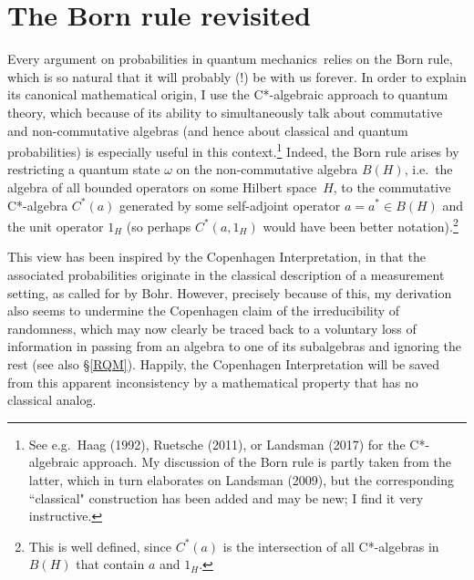 \documentclass[11pt,a4paper]{article}
\numberwithin{equation}{section}
\newcommand{\qm}{quantum mechanics}
\newcommand{\Hs}{Hilbert space} \newcommand{\Bs}{Banach space}
\newcommand{\om}{\omega} \newcommand{\Om}{\Omega}
\begin{document}
 \section{The Born rule revisited}\label{BR}
 Every argument on probabilities in \qm\ relies on the Born rule, which is so natural that it will probably (!) be with us forever. In order to explain its canonical mathematical origin, I use the C*-algebraic approach to quantum theory, which because of its ability to simultaneously talk about commutative and non-commutative algebras (and hence about classical and quantum probabilities) is especially useful in this context.\footnote{See e.g.\ Haag (1992), Ruetsche (2011), or Landsman (2017) for the  C*-algebraic approach. My discussion of the Born rule is partly taken from the latter, which in turn elaborates on Landsman (2009), but the corresponding ``classical" construction has been added and may be new; I find it very instructive.} Indeed, the Born rule arises  by restricting a quantum state $\om$ on the non-commutative algebra $B(H)$, i.e.\ the algebra of all bounded operators on some \Hs\ $H$,  to the commutative  C*-algebra $C^*(a)$ generated by some self-adjoint operator $a=a^*\in B(H)$ and the unit operator $1_H$ (so perhaps $C^*(a,1_H)$ would have been better notation).\footnote{This is well defined, since $C^*(a)$ is  the intersection of all C*-algebras in $B(H)$ that contain $a$ and $1_H$.}  
 
 This view has been inspired by  the Copenhagen Interpretation, in that the associated probabilities originate in the classical description of a measurement setting, as called for by Bohr. However, 
precisely because of this, my derivation also seems to undermine the Copenhagen claim of the irreducibility of randomness, which may now clearly be traced back to a voluntary loss of information in passing from an algebra to one of its subalgebras and ignoring the rest (see also \S\ref{RQM}). Happily, the Copenhagen Interpretation will be saved from this apparent inconsistency by a mathematical property that has no classical analog.
\end{document}
